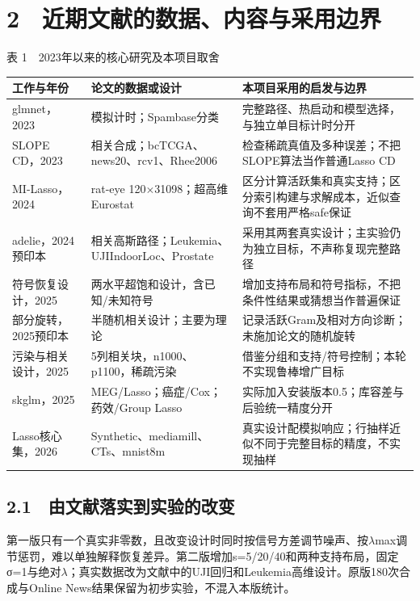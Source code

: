 \documentclass[UTF8,fontset=fandol,10pt]{ctexart}
\begin{document}
\section*{2　近期文献的数据、内容与采用边界}
\begin{center}{\small 表 1　2023年以来的核心研究及本项目取舍}\\\small\begin{tabularx}{\linewidth}{lXX}
\toprule
工作与年份 & 论文的数据或设计 & 本项目采用的启发与边界 \\ \midrule
glmnet，2023\cite{tay2023glmnet} & 模拟计时；Spambase分类 & 完整路径、热启动和模型选择，与独立单目标计时分开 \\
SLOPE CD，2023\cite{larsson2023slope} & 相关合成；bcTCGA、news20、rcv1、Rhee2006 & 检查稀疏真值及多种误差；不把SLOPE算法当作普通Lasso CD \\
MI-Lasso，2024\cite{zogala2024screening} & rat-eye 120\ensuremath{\times}31098；超高维Eurostat & 区分计算活跃集和真实支持；区分索引构建与求解成本，近似查询不套用严格safe保证 \\
adelie，2024预印本\cite{yang2024adelie} & 相关高斯路径；Leukemia、UJIIndoorLoc、Prostate & 采用其两套真实设计；主实验仍为独立目标，不声称复现完整路径 \\
符号恢复设计，2025\cite{stallrich2025} & 两水平超饱和设计，含已知/未知符号 & 增加支持布局和符号指标，不把条件性结果或猜想当作普遍保证 \\
部分旋转，2025预印本\cite{buhai2025} & 半随机相关设计；主要为理论 & 记录活跃Gram及相对方向诊断；未施加论文的随机旋转 \\
污染与相关设计，2025\cite{minsker2025} & 5列相关块，n1000、p1100，稀疏污染 & 借鉴分组和支持/符号控制；本轮不实现鲁棒增广目标 \\
skglm，2025\cite{moufad2025} & MEG/Lasso；癌症/Cox；药效/Group Lasso & 实际加入安装版本0.5；库容差与后验统一精度分开 \\
Lasso核心集，2026\cite{zou2026coreset} & Synthetic、mediamill、CTs、mnist8m & 真实设计配模拟响应；行抽样近似不同于完整目标的精度，不实现抽样 \\
\bottomrule\end{tabularx}\end{center}
\subsection*{2.1　由文献落实到实验的改变}
第一版只有一个真实非零数，且改变设计时同时按信号方差调节噪声、按\ensuremath{\lambda}max调节惩罚，难以单独解释恢复差异。第二版增加s=5/20/40和两种支持布局，固定σ=1与绝对\ensuremath{\lambda}；真实数据改为文献中的UJI回归和Leukemia高维设计。原版180次合成与Online News结果保留为初步实验，不混入本版统计。
\end{document}
